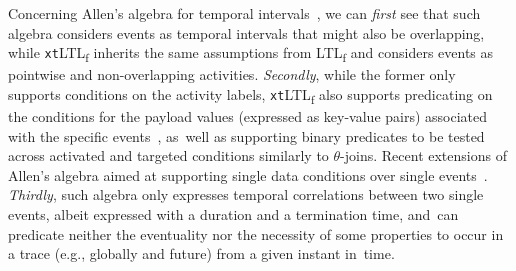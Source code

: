 \documentclass[information,article,accept,pdftex,oneauthor]{Definitions/mdpi}
\begin{document}
Concerning Allen's algebra for temporal intervals~\cite{10.1145/182.358434}, we can \textit{first} see that such algebra considers events as temporal intervals that might also be overlapping, while \texttt{xt}LTL\textsubscript{f} inherits the same assumptions from LTL\textsubscript{f} and considers events as pointwise and non-overlapping activities. \textit{Secondly}, while the former only supports conditions on the activity labels, \texttt{xt}LTL\textsubscript{f} also supports predicating on the conditions for the payload values (expressed as key-value pairs) associated with the specific events~\cite{info14030173}, as~well as supporting binary predicates to be tested across activated and targeted conditions similarly to $\theta$-joins. Recent extensions of Allen's algebra aimed at supporting single data conditions over single events~\cite{DBLP:books/sp/22/MurillasRA22}. \textit{Thirdly}, such algebra only expresses temporal correlations between two single events, albeit expressed with a duration and a termination time, and~can predicate  neither the eventuality nor the necessity of some properties to occur in a trace (e.g., globally and future) from a given instant in~time.
\end{document}
